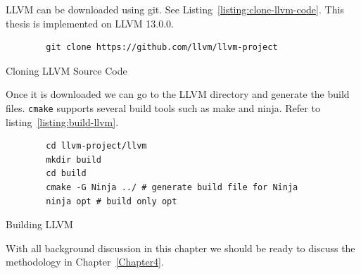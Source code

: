 LLVM can be downloaded using git. See Listing~\ref{listing:clone-llvm-code}.
This thesis is implemented on LLVM 13.0.0.

\begin{listing}[htbp]
    \begin{verbatim}
        git clone https://github.com/llvm/llvm-project
    \end{verbatim}
    \caption{Cloning LLVM Source Code}    
    \label{listing:clone-llvm-code}
\end{listing}

Once it is downloaded we can go to the LLVM directory and generate the build
files. \texttt{cmake} supports several build tools such as make and ninja. Refer
to listing~\ref{listing:build-llvm}.

\begin{listing}[htbp]
    \begin{verbatim}
        cd llvm-project/llvm
        mkdir build
        cd build
        cmake -G Ninja ../ # generate build file for Ninja
        ninja opt # build only opt
    \end{verbatim}
\caption{Building LLVM}    
\label{listing:build-llvm}
\end{listing}

With all background discussion in this chapter we should be ready to discuss the
methodology in Chapter~\ref{Chapter4}.
